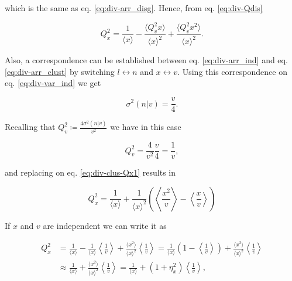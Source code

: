 which is the same as eq. \eqref{eq:div-arr_disg}. Hence, from eq. \eqref{eq:div-Qdis}

\begin{equation}
  \label{eq:div-clus-Qx1}
  Q_x^2 = \frac{1}{\langle x\rangle} - \frac{\langle Q_v^2x\rangle}{\langle x\rangle^2} + \frac{\langle Q_v^2x^2\rangle}{\langle x\rangle^2}.
\end{equation}

Also, a correspondence can be established between eq. \eqref{eq:div-arr_ind} and eq. \eqref{eq:div-arr_clust} by switching $l\leftrightarrow n$ and $x\leftrightarrow v$. Using this correspondence on eq. \eqref{eq:div-var_ind} we get 

\begin{equation}
  \sigma^2(n|v) = \frac{v}{4}.
\end{equation}

Recalling that $Q_v^2 \coloneqq \frac{4\sigma^2(n|v)}{v^2}$ we have in this case

\begin{equation}
  Q_v^2 = \frac{4}{v^2}\frac{v}{4} = \frac{1}{v},
\end{equation}

and replacing on eq. \eqref{eq:div-clus-Qx1} results in

\begin{equation}
  \label{eq:div-clus-Qx2}
  \boxed{Q_x^2 = \frac{1}{\langle x\rangle} + \frac{1}{\langle x\rangle^2}\left(\left\langle \frac{x^2}{v}\right\rangle-\left\langle \frac{x}{v}\right\rangle \right)}
\end{equation}

If $x$ and $v$ are independent we can write it as

\begin{equation*}
  \begin{split}
    Q_x^2 &= \frac{1}{\langle x\rangle} - \frac{1}{\langle x\rangle}\left\langle\frac{1}{v}\right\rangle + \frac{\langle x^2\rangle}{\langle x\rangle^2}\left\langle\frac{1}{v}\right\rangle = \frac{1}{\langle x\rangle}\left(1-\left\langle\frac{1}{v}\right\rangle\right)+\frac{\langle x^2\rangle}{\langle x\rangle^2}\left\langle\frac{1}{v}\right\rangle\\
  &\approx \frac{1}{\langle x\rangle} + \frac{\langle x^2\rangle}{\langle x\rangle^2}\left\langle\frac{1}{v}\right\rangle = \frac{1}{\langle x\rangle} + \left(1+\eta_x^2\right)\left\langle\frac{1}{v}\right\rangle,
  \end{split}
\end{equation*}

